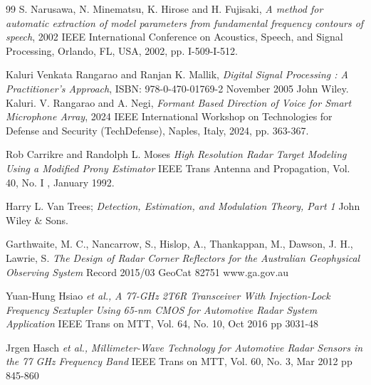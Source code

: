 \begin{thebibliography}{99}
S. Narusawa, N. Minematsu, K. Hirose and H. Fujisaki, {\em A method for automatic extraction of model parameters from fundamental frequency contours of speech}, 2002 IEEE International Conference on Acoustics, Speech, and Signal Processing, Orlando, FL, USA, 2002, pp. I-509-I-512.	

Kaluri Venkata Rangarao and Ranjan K. Mallik, {\em Digital Signal Processing : A Practitioner's Approach}, ISBN: 978-0-470-01769-2 November 2005 John Wiley.
Kaluri. V. Rangarao and A. Negi, {\em Formant Based Direction of Voice for Smart Microphone Array}, 2024 IEEE International Workshop on Technologies for Defense and Security (TechDefense), Naples, Italy, 2024, pp. 363-367.	

Rob Carrikre and Randolph L. Moses
{\it High Resolution Radar Target Modeling Using a Modified Prony Estimator}
IEEE Trans Antenna and Propagation, Vol. 40, No. I , January 1992.


Harry L. Van Trees;
{\it Detection, Estimation, and Modulation Theory, Part 1}
John Wiley \& Sons.

Garthwaite, M. C., Nancarrow, S., Hislop, A., Thankappan, M., Dawson, J. H., Lawrie, S.
{\it The Design of Radar Corner Reflectors for the Australian Geophysical Observing System}
Record 2015/03 GeoCat 82751 www.ga.gov.au


Yuan-Hung Hsiao	
{\em et al.,}	
{\em A 77-GHz 2T6R Transceiver With Injection-Lock
	Frequency Sextupler Using 65-nm CMOS for
	Automotive Radar System Application}
IEEE Trans on MTT, Vol. 64, No. 10, Oct 2016 pp 3031-48	

Jrgen Hasch
{\em et al.,}
{\em Millimeter-Wave Technology for Automotive Radar Sensors in the 77 GHz Frequency Band}
IEEE Trans on MTT, Vol. 60, No. 3, Mar 2012 pp 845-860




	
\end{thebibliography}
